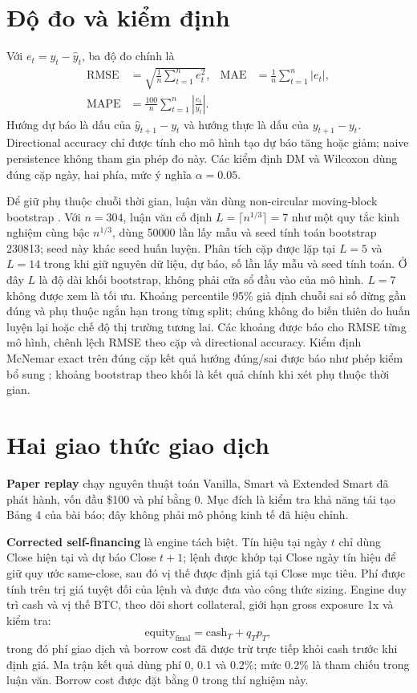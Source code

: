 \documentclass[13pt,a4paper,oneside]{report}
\begin{document}
\section{Độ đo và kiểm định}\label{sec:metrics}
Với $e_t=y_t-\widehat{y}_t$, ba độ đo chính là
\begin{align}
\mathrm{RMSE} &= \sqrt{\frac{1}{n}\sum_{t=1}^{n}e_t^2}, &
\mathrm{MAE} &= \frac{1}{n}\sum_{t=1}^{n}|e_t|, \\
\mathrm{MAPE} &= \frac{100}{n}\sum_{t=1}^{n}\left|\frac{e_t}{y_t}\right|.
\end{align}
Hướng dự báo là dấu của $\widehat{y}_{t+1}-y_t$ và hướng thực là dấu của $y_{t+1}-y_t$.
Directional accuracy chỉ được tính cho mô hình tạo dự báo tăng hoặc giảm; naive persistence không
tham gia phép đo này. Các kiểm định DM và Wilcoxon dùng đúng cặp ngày, hai phía, mức ý nghĩa
$\alpha=0.05$.

Để giữ phụ thuộc chuỗi thời gian, luận văn dùng non-circular moving-block bootstrap
\cite{kunsch1989,buhlmann1999}. Với $n=304$, luận văn cố định
$L=\lceil n^{1/3}\rceil=\num{7}$ như một quy tắc kinh nghiệm cùng bậc $n^{1/3}$, dùng
\num{50000} lần lấy mẫu và seed tính toán bootstrap \num{230813}; seed này khác seed huấn luyện.
Phân tích cặp được lặp tại $L=\num{5}$ và $L=\num{14}$ trong khi giữ nguyên dữ liệu, dự báo,
số lần lấy mẫu và seed tính toán. Ở đây $L$ là độ dài khối bootstrap, không phải cửa sổ đầu vào của
mô hình. $L=\num{7}$ không được xem là tối ưu. Khoảng
percentile 95\% giả định chuỗi sai số dừng gần đúng và phụ thuộc ngắn hạn trong từng split; chúng
không đo biến thiên do huấn luyện lại hoặc chế độ thị trường tương lai. Các khoảng được báo cho
RMSE từng mô hình, chênh lệch RMSE theo cặp và directional accuracy.
Kiểm định McNemar exact trên đúng cặp kết quả hướng đúng/sai được báo như phép kiểm bổ sung
\cite{mcnemar1947}; khoảng bootstrap theo khối là kết quả chính khi xét phụ thuộc thời gian.

\section{Hai giao thức giao dịch}\label{sec:trading-method}
\textbf{Paper replay} chạy nguyên thuật toán Vanilla, Smart và Extended Smart đã phát hành, vốn đầu
\$100 và phí bằng 0. Mục đích là kiểm tra khả năng tái tạo Bảng 4 của bài báo; đây không phải mô
phỏng kinh tế đã hiệu chỉnh.

\textbf{Corrected self-financing} là engine tách biệt. Tín hiệu tại ngày $t$ chỉ dùng Close hiện tại
và dự báo Close $t+1$; lệnh được khớp tại Close ngày tín hiệu để giữ quy ước same-close, sau đó vị
thế được định giá tại Close mục tiêu. Phí được tính trên trị giá tuyệt đối của lệnh và được đưa vào
công thức sizing. Engine duy trì cash và vị thế BTC, theo dõi short collateral, giới hạn gross exposure
1x và kiểm tra:
\begin{equation}\label{eq:reconcile}
\mathrm{equity}_{\mathrm{final}}=
\mathrm{cash}_{T}+q_Tp_T,
\end{equation}
trong đó phí giao dịch và borrow cost đã được trừ trực tiếp khỏi cash trước khi định giá.
Ma trận kết quả dùng phí 0, 0.1 và 0.2\%; mức 0.2\% là tham chiếu trong luận văn. Borrow cost được
đặt bằng 0 trong thí nghiệm này.
\end{document}
